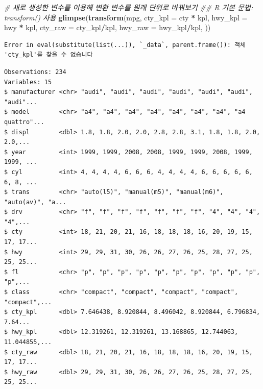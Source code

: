 \documentclass[
  11pt,
]{krantz}
\newenvironment{Shaded}{\begin{snugshade}}{\end{snugshade}}
\newcommand{\CommentTok}[1]{\textcolor[rgb]{0.37,0.37,0.37}{\textit{#1}}}
\newcommand{\DataTypeTok}[1]{\textcolor[rgb]{0.27,0.27,0.27}{#1}}
\newcommand{\KeywordTok}[1]{\textcolor[rgb]{0.27,0.27,0.27}{\textbf{#1}}}
\newcommand{\NormalTok}[1]{#1}
\newcommand{\OperatorTok}[1]{\textcolor[rgb]{0.43,0.43,0.43}{\textbf{#1}}}
\newcommand{\StringTok}[1]{\textcolor[rgb]{0.5,0.5,0.5}{#1}}
\begin{document}
\begin{Shaded}
\begin{Highlighting}[]
\CommentTok{# 새로 생성한 변수를 이용해 변환 변수를 원래 단위로 바꿔보기}
\CommentTok{## R 기본 문법: transform() 사용}
\KeywordTok{glimpse}\NormalTok{(}\KeywordTok{transform}\NormalTok{(mpg, }
                  \DataTypeTok{cty_kpl =}\NormalTok{ cty }\OperatorTok{*}\StringTok{ }\NormalTok{kpl, }
                  \DataTypeTok{hwy_kpl =}\NormalTok{ hwy }\OperatorTok{*}\StringTok{ }\NormalTok{kpl,}
                  \DataTypeTok{cty_raw =}\NormalTok{ cty_kpl}\OperatorTok{/}\NormalTok{kpl,}
                  \DataTypeTok{hwy_raw =}\NormalTok{ hwy_kpl}\OperatorTok{/}\NormalTok{kpl,}
\NormalTok{                  )) }
\end{Highlighting}
\end{Shaded}

\begin{verbatim}
Error in eval(substitute(list(...)), `_data`, parent.frame()): 객체 'cty_kpl'를 찾을 수 없습니다
\end{verbatim}

\begin{Shaded}
\end{Shaded}

\begin{verbatim}
Observations: 234
Variables: 15
$ manufacturer <chr> "audi", "audi", "audi", "audi", "audi", "audi", "audi"...
$ model        <chr> "a4", "a4", "a4", "a4", "a4", "a4", "a4", "a4 quattro"...
$ displ        <dbl> 1.8, 1.8, 2.0, 2.0, 2.8, 2.8, 3.1, 1.8, 1.8, 2.0, 2.0,...
$ year         <int> 1999, 1999, 2008, 2008, 1999, 1999, 2008, 1999, 1999, ...
$ cyl          <int> 4, 4, 4, 4, 6, 6, 6, 4, 4, 4, 4, 6, 6, 6, 6, 6, 6, 8, ...
$ trans        <chr> "auto(l5)", "manual(m5)", "manual(m6)", "auto(av)", "a...
$ drv          <chr> "f", "f", "f", "f", "f", "f", "f", "4", "4", "4", "4",...
$ cty          <int> 18, 21, 20, 21, 16, 18, 18, 18, 16, 20, 19, 15, 17, 17...
$ hwy          <int> 29, 29, 31, 30, 26, 26, 27, 26, 25, 28, 27, 25, 25, 25...
$ fl           <chr> "p", "p", "p", "p", "p", "p", "p", "p", "p", "p", "p",...
$ class        <chr> "compact", "compact", "compact", "compact", "compact",...
$ cty_kpl      <dbl> 7.646438, 8.920844, 8.496042, 8.920844, 6.796834, 7.64...
$ hwy_kpl      <dbl> 12.319261, 12.319261, 13.168865, 12.744063, 11.044855,...
$ cty_raw      <dbl> 18, 21, 20, 21, 16, 18, 18, 18, 16, 20, 19, 15, 17, 17...
$ hwy_raw      <dbl> 29, 29, 31, 30, 26, 26, 27, 26, 25, 28, 27, 25, 25, 25...
\end{verbatim}
\end{document}
